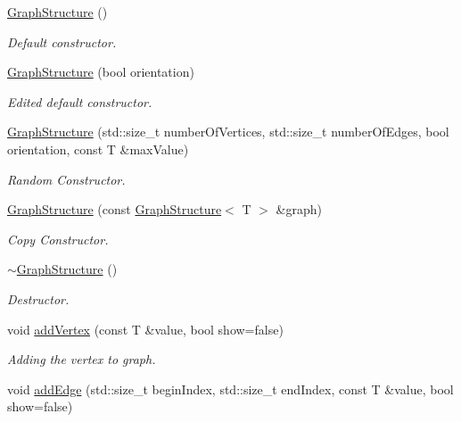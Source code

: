 \begin{DoxyCompactItemize}
\item 
\mbox{\hyperlink{classgs_1_1_graph_structure_a5a816a9d12685c2c429958131cd950a6}{Graph\+Structure}} ()
\begin{DoxyCompactList}\small\item\em Default constructor. \end{DoxyCompactList}\item 
\mbox{\hyperlink{classgs_1_1_graph_structure_aba14df4f7f6e35d54f27d69145603cd5}{Graph\+Structure}} (bool orientation)
\begin{DoxyCompactList}\small\item\em Edited default constructor. \end{DoxyCompactList}\item 
\mbox{\hyperlink{classgs_1_1_graph_structure_a7b2ccfb7dfad4317cad69b4296a20173}{Graph\+Structure}} (std\+::size\+\_\+t number\+Of\+Vertices, std\+::size\+\_\+t number\+Of\+Edges, bool orientation, const T \&max\+Value)
\begin{DoxyCompactList}\small\item\em Random Constructor. \end{DoxyCompactList}\item 
\mbox{\hyperlink{classgs_1_1_graph_structure_a30f102d272103f65b86945164bd99e0e}{Graph\+Structure}} (const \mbox{\hyperlink{classgs_1_1_graph_structure}{Graph\+Structure}}$<$ T $>$ \&graph)
\begin{DoxyCompactList}\small\item\em Copy Constructor. \end{DoxyCompactList}\item 
\mbox{\hyperlink{classgs_1_1_graph_structure_aadb408a61239261f483de8d603263475}{$\sim$\+Graph\+Structure}} ()
\begin{DoxyCompactList}\small\item\em Destructor. \end{DoxyCompactList}\item 
void \mbox{\hyperlink{classgs_1_1_graph_structure_aa72563ed8e2cd77086451dc0cd8ed280}{add\+Vertex}} (const T \&value, bool show=false)
\begin{DoxyCompactList}\small\item\em Adding the vertex to graph. \end{DoxyCompactList}\item 
void \mbox{\hyperlink{classgs_1_1_graph_structure_af917d0945351f897f5de14d0ea527170}{add\+Edge}} (std\+::size\+\_\+t begin\+Index, std\+::size\+\_\+t end\+Index, const T \&value, bool show=false)

\end{DoxyCompactItemize}
